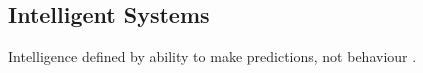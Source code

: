\subsection{Intelligent Systems}

Intelligence defined by ability to make predictions, not behaviour \cite{intelligence_is_prediction}.

%
%
%
%
%
%
